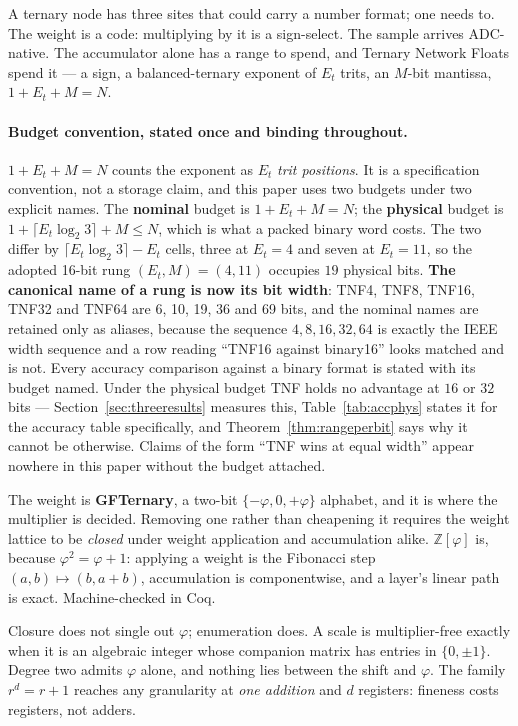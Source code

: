 A ternary node has three sites that could carry a number format; one needs to.
The weight is a code: multiplying by it is a sign-select. The sample arrives
ADC-native. The accumulator alone has a range to spend, and Ternary Network
Floats spend it --- a sign, a balanced-ternary exponent of $E_t$ trits, an
$M$-bit mantissa, $1+E_t+M=N$.

\paragraph{Budget convention, stated once and binding throughout.}\label{sec:budget}
$1+E_t+M=N$ counts the exponent as $E_t$ \emph{trit positions}. It is a
specification convention, not a storage claim, and this paper uses two budgets
under two explicit names. The \textbf{nominal} budget is $1+E_t+M=N$; the
\textbf{physical} budget is $1+\lceil E_t\log_2 3\rceil+M \le N$, which is what a
packed binary word costs. The two differ by
$\lceil E_t\log_2 3\rceil - E_t$ cells, three at $E_t=4$ and seven at $E_t=11$, so
the adopted 16-bit rung $(E_t,M)=(4,11)$ occupies $19$ physical bits.
\textbf{The canonical name of a rung is now its bit width}: TNF4, TNF8, TNF16,
TNF32 and TNF64 are 6, 10, 19, 36 and 69 bits, and the nominal names are retained
only as aliases, because the sequence $4,8,16,32,64$ is exactly the IEEE width
sequence and a row reading ``TNF16 against binary16'' looks matched and is not.
Every accuracy comparison against a binary format is stated with its budget named.
Under the physical budget TNF holds no advantage at $16$ or $32$ bits ---
Section~\ref{sec:threeresults} measures this, Table~\ref{tab:accphys} states it
for the accuracy table specifically, and Theorem~\ref{thm:rangeperbit} says why it
cannot be otherwise. Claims of the form ``TNF wins at equal width'' appear nowhere
in this paper without the budget attached.

The weight is \textbf{GFTernary}, a two-bit $\{-\varphi,0,+\varphi\}$ alphabet,
and it is where the multiplier is decided. Removing one rather than cheapening
it requires the weight lattice to be \emph{closed} under weight application and
accumulation alike. $\mathbb{Z}[\varphi]$ is, because $\varphi^2=\varphi+1$:
applying a weight is the Fibonacci step $(a,b)\mapsto(b,a+b)$, accumulation is
componentwise, and a layer's linear path is exact. Machine-checked in Coq.

Closure does not single out $\varphi$; enumeration does. A scale is
multiplier-free exactly when it is an algebraic integer whose companion matrix
has entries in $\{0,\pm1\}$. Degree two admits $\varphi$ alone, and nothing lies
between the shift and $\varphi$. The family $r^d=r+1$ reaches any granularity at
\emph{one addition} and $d$ registers: fineness costs registers, not adders.

